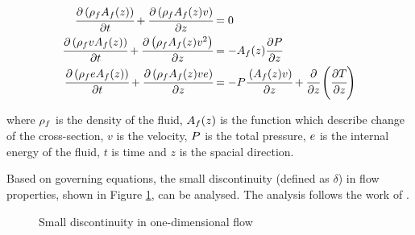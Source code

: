 \documentclass[a4paper,fleqn]{cas-dc}
\begin{document}
{\footnotesize
	\begin{align}
		\label{EQ: CompressibleEuler_1}
		\cfrac{\partial \left( {\color{black}\rho_f} {\color{black}A_f}(z) \right) }{\partial t} + \cfrac{\partial \left( {\color{black}\rho_f} {\color{black}A_f}(z) v \right)}{\partial z} &= 0 \\
		\cfrac{\partial \left( {\color{black}\rho_f} v {\color{black}A_f}(z) \right) }{\partial t} + \cfrac{\partial \left( {\color{black}\rho_f} {\color{black}A_f}(z) v^2 \right)}{\partial z} &= -{\color{black}A_f}(z) \cfrac{\partial {\color{black}P}}{\partial z} \label{EQ: CompressibleEuler_2} \\
		\cfrac{\partial \left( {\color{black}\rho_f} {\color{black}e} {\color{black}A_f}(z) \right) }{\partial t} + \cfrac{\partial \left( {\color{black}\rho_f} {\color{black}A_f}(z) v {\color{black}e}\right)}{\partial z} &= -{\color{black}P}\cfrac{\left( {\color{black}A_f}(z) v \right)}{\partial z} + \cfrac{\partial}{\partial z} \left( \cfrac{\partial {\color{black}T}}{\partial z} \right)   
		\label{EQ: CompressibleEuler_3}
	\end{align}  
}

where ${\color{black}\rho_f}$ is the density of the fluid, ${\color{black}A_f}(z)$ is the function which describe change of the cross-section, $v$ is the velocity, ${\color{black}P}$ is the total pressure, ${\color{black}e}$ is the internal energy of the fluid, $t$ is time and $z$ is the spacial direction.

Based on governing equations, the small discontinuity (defined as $\delta$) in flow properties, shown in Figure \ref{fig: Discontinuity_slow_flow}, can be analysed. The analysis follows the work of \citet{Schreier1982}.

\begin{figure}[!h]
	\centering
	\caption{Small discontinuity in one-dimensional flow}
	\label{fig: Discontinuity_slow_flow}
\end{figure} 
\end{document}
